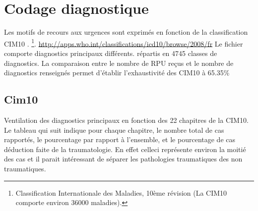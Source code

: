 \documentclass[12pt,english,french,twoside]{report}\usepackage[]{graphicx}\usepackage[]{color}
\begin{document}
\newpage
\chapter{Codage diagnostique}

%




Les motifs de recours aux urgences sont exprimés en fonction de la classification CIM10 \cite{10}.
\footnote{Classification Internationale des Maladies, 10ème révision (La CIM10 comporte environ 36000 maladies).}.
\url{http://apps.who.int/classifications/icd10/browse/2008/fr}
Le fichier comporte  diagnostics principaux différents.
répartis en 4745 classes de diagnostics.
La comparaison entre le nombre de RPU reçus et le nombre de diagnostics renseignés permet d'établir l'exhaustivité des CIM10 à 65.35\% 


\section{Cim10}

Ventilation des diagnostics principaux en fonction des 22 chapitres de la CIM10. Le tableau qui suit indique pour chaque chapitre, le nombre total de cas rapportés, le pourcentage par rapport à l'ensemble, et le pourcentage de cas déduction faite de la traumatologie. En effet celleci représente environ la moitié des cas et il parait intéressant de séparer les pathologies traumatiques des non traumatiques.





\end{document}
